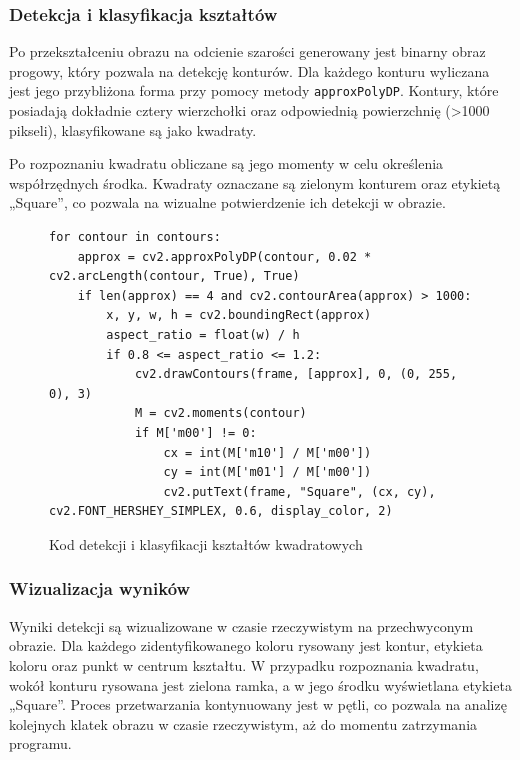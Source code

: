 \subsubsection{Detekcja i klasyfikacja kształtów}

Po przekształceniu obrazu na odcienie szarości generowany jest binarny obraz progowy, który pozwala na detekcję konturów. Dla każdego konturu wyliczana jest jego przybliżona forma przy pomocy metody \texttt{approxPolyDP}. Kontury, które posiadają dokładnie cztery wierzchołki oraz odpowiednią powierzchnię (>1000 pikseli), klasyfikowane są jako kwadraty.

Po rozpoznaniu kwadratu obliczane są jego momenty w celu określenia współrzędnych środka. Kwadraty oznaczane są zielonym konturem oraz etykietą „Square”, co pozwala na wizualne potwierdzenie ich detekcji w obrazie.

\begin{figure}[h!]
  \centering
  \begin{lstlisting}
for contour in contours:
    approx = cv2.approxPolyDP(contour, 0.02 * cv2.arcLength(contour, True), True)
    if len(approx) == 4 and cv2.contourArea(approx) > 1000:
        x, y, w, h = cv2.boundingRect(approx)
        aspect_ratio = float(w) / h
        if 0.8 <= aspect_ratio <= 1.2:
            cv2.drawContours(frame, [approx], 0, (0, 255, 0), 3)
            M = cv2.moments(contour)
            if M['m00'] != 0:
                cx = int(M['m10'] / M['m00'])
                cy = int(M['m01'] / M['m00'])
                cv2.putText(frame, "Square", (cx, cy), cv2.FONT_HERSHEY_SIMPLEX, 0.6, display_color, 2)
  \end{lstlisting}
  \caption{Kod detekcji i klasyfikacji kształtów kwadratowych}
  \label{fig:square_detection}
\end{figure}

\subsubsection{Wizualizacja wyników}

Wyniki detekcji są wizualizowane w czasie rzeczywistym na przechwyconym obrazie. Dla każdego zidentyfikowanego koloru rysowany jest kontur, etykieta koloru oraz punkt w centrum kształtu. W przypadku rozpoznania kwadratu, wokół konturu rysowana jest zielona ramka, a w jego środku wyświetlana etykieta „Square”. Proces przetwarzania kontynuowany jest w pętli, co pozwala na analizę kolejnych klatek obrazu w czasie rzeczywistym, aż do momentu zatrzymania programu.

